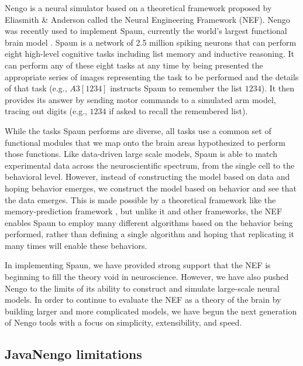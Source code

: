\documentclass{frontiersSCNS}
\begin{document}
Nengo is a neural simulator
based on a theoretical framework proposed
by Eliasmith \& Anderson \citeyearpar{TODO}
called the Neural Engineering Framework
(NEF).
Nengo was recently used to implement Spaun,
currently the world's largest functional brain model
\cite{TODO}.
Spaun is a network of 2.5 million spiking neurons
that can perform eight high-level cognitive tasks
including list memory and inductive reasoning.
It can perform any of these eight tasks
at any time by being presented
the appropriate series of images
representing the task to be performed
and the details of that task
(e.g., $A3[1234]$ instructs Spaun
to remember the list $1234$).
It then provides its answer by
sending motor commands to a simulated arm model,
tracing out digits
(e.g., $1234$ if asked to recall the remembered list).

While the tasks Spaun performs are diverse,
all tasks use a common set of
functional modules that we map
onto the brain areas hypothesized
to perform those functions.
Like data-driven large scale models,
Spaun is able to match experimental data
across the neuroscientific spectrum,
from the single cell to the behavioral level.
However, instead of constructing the model
based on data and hoping behavior emerges,
we construct the model
based on behavior
and see that the data emerges.
This is made possible by a theoretical framework
like the memory-prediction framework \cite{TODO},
but unlike it and other frameworks,
the NEF enables Spaun to employ
many different algorithms
based on the behavior being performed,
rather than defining a single algorithm
and hoping that replicating it
many times will enable these behaviors.

In implementing Spaun,
we have provided strong support
that the NEF is beginning to fill the theory void in neuroscience.
However, we have also pushed Nengo
to the limits of its ability to construct and simulate
large-scale neural models.
In order to continue to evaluate the NEF
as a theory of the brain
by building larger and more complicated models,
we have begun the next generation
of Nengo tools with a focus on simplicity,
extensibility, and speed.

\subsection{JavaNengo limitations}
\end{document}
